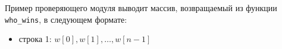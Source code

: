 Пример проверяющего модуля выводит массив, возвращаемый из функции \texttt{who\_wins}, в
следующем формате:
\begin{itemize}
\item строка 1: $w[0], w[1], \ldots, w[n - 1]$
\end{itemize}